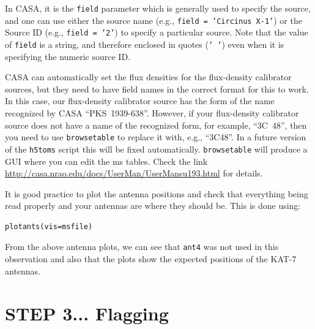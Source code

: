 \documentclass[force,almostfull,justified]{tufte-book}
\begin{document}
In CASA, it is the {\tt field} parameter which is generally used to specify the source, and one can
use either the source name (e.g., {\tt field = 'Circinus X-1'}) or the Source ID (e.g., {\tt field =
'2'}) to specify a particular source.  Note that the value of {\tt field} is a string, and therefore
enclosed in quotes ({\tt ' '}) even when it is specifying the numeric source ID.

CASA can automatically set the flux densities for the flux-density calibrator sources, but they need
to have field names in the correct format for this to work.  In this case, our flux-density calibrator
source has the form of the name recognized by CASA ``PKS~1939-638''.  However, if your flux-density
calibrator source does not have a name of the recognized form, for example, ``3C~48'', then you need
to use {\tt browsetable} to replace it with, e.g., ``3C48''.  In a future version of the {\tt h5toms}
script this will be fixed automatically.  {\tt browsetable} will produce a GUI where you can edit the
ms tables. Check the link
\mbox{\url{http://casa.nrao.edu/docs/UserMan/UserMansu193.html}} for details.

It is good practice to plot the antenna positions and check that everything being read properly and
your antennas are where they should be. This is done using:

\begin{casacmd}
\begin{verbatim}
plotants(vis=msfile)
\end{verbatim}
\end{casacmd}

From the above antenna plots, we can see that {\tt ant4} was not used in this observation and also
that the plots show the expected positions of the KAT-7 antennas.


\section{STEP 3... Flagging}
\end{document}
